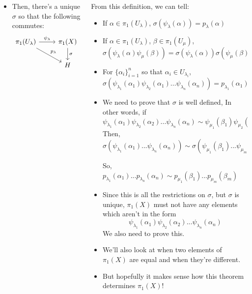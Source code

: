 \documentclass[8pt]{beamer}
\begin{document}
\begin{frame}
\begin{columns}
\begin{column}[T]{0.5\textwidth}
\begin{itemize}
          \item Then, there's a unique $\sigma$ so that the following commutes:
            \[\begin{tikzcd}[ampersand replacement=\&]
                \pi_1(U_\lambda) \ar[rd, "p_\lambda"] \ar[r, "\psi_\lambda"] \&
                \pi_1(X) \ar[d, "\sigma"] \\
                  \& H
              \end{tikzcd}\]
        \end{itemize}
      \end{column}
      \begin{column}[T]{0.5\textwidth}
        From this definition, we can tell:
        \begin{itemize}
          \item If $\alpha \in \pi_1(U_\lambda)$, $\sigma(\psi_\lambda(\alpha)) = p_\lambda(\alpha)$
          \item If $\alpha \in \pi_1(U_\lambda)$, $\beta \in \pi_1(U_\mu)$,
            \[\sigma(\psi_\lambda(\alpha)\psi_\mu(\beta)) =
            \sigma(\psi_\lambda(\alpha))\sigma(\psi_\mu(\beta)) =
            p_\lambda(\alpha)p_\mu(\beta)\]
          \item For $\{\alpha_i\}_{i=1}^n$ so that $\alpha_i \in U_{\lambda_i}$,
            \[\sigma(\psi_{\lambda_1}(\alpha_1)\psi_{\lambda_2}(\alpha_1) ...
            \psi_{\lambda_n}(\alpha_n)) = p_{\lambda_1}(\alpha_1)p_{\lambda_2}(
            \alpha_2) ... p_{\lambda_n}(\alpha_n)\]
          \item We need to prove that $\sigma$ is well defined, In other words,
            if
            \[\psi_{\lambda_1}(\alpha_1) \psi_{\lambda_2}(\alpha_2) ...
              \psi_{\lambda_n}(\alpha_n) \sim \psi_{\mu_1}(\beta_1)
              \psi_{\mu_2}(\beta_2) ... \psi_{\mu_m}(\beta_m)\]
            Then, $\sigma(\psi_{\lambda_1}(\alpha_1) ...
              \psi_{\lambda_n}(\alpha_n)) \sim \sigma(\psi_{\mu_1}(\beta_1) ...
              \psi_{\mu_m}(\beta_m))$
 
            So, \quad \quad \ \ $p_{\lambda_1}(\alpha_1) ... p_{\lambda_n}(\alpha_n)
              \sim p_{\mu_1}(\beta_1) ... p_{\mu_m}(\beta_m)$
          \item Since this is all the restrictions on $\sigma$, but $\sigma$ is
            unique, $\pi_1(X)$ must not have any elements which aren't in the
            form
              \[\psi_{\lambda_1}(\alpha_1) \psi_{\lambda_2}(\alpha_2) ...
              \psi_{\lambda_n}(\alpha_n)\]
            We also need to prove this.
          \item We'll also look at when two elements of $\pi_1(X)$ are equal and
            when they're different.
          \item But hopefully it makes sense how this theorem determines
            $\pi_1(X)$!
        \end{itemize}
      \end{column}
    \end{columns}
  \end{frame}
\end{document}
